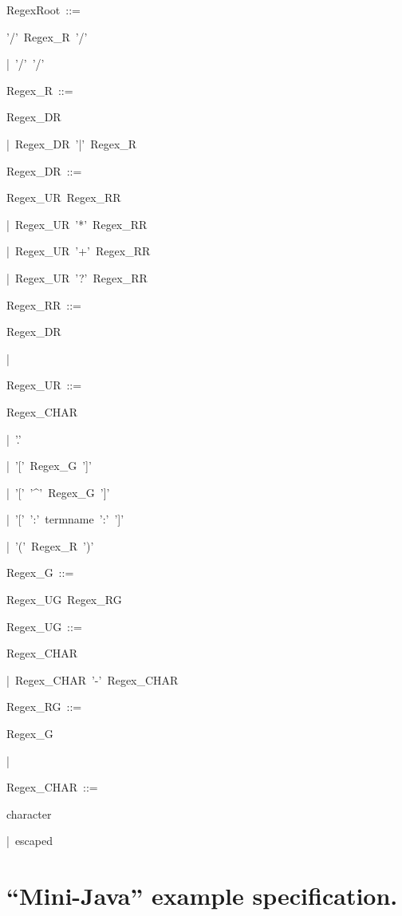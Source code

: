 \documentclass[12pt,english,twoside]{report}
\newenvironment{codeblock}
{\begin{list}{}{
\setlength{\rightmargin}{\leftmargin}
\setlength{\listparindent}{0pt}%
\raggedright
\setlength{\itemsep}{0pt}
\setlength{\parsep}{0pt}
\normalfont\ttfamily}%
 \item[]}
{\end{list}}
\begin{document}
\begin{codeblock}
RegexRoot~::=
\begin{codeblock}
'/'~Regex\_R~'/'

|~'/'~'/'
\end{codeblock}
Regex\_R~::=
\begin{codeblock}
Regex\_DR

|~Regex\_DR~'|'~Regex\_R
\end{codeblock}
Regex\_DR~::=
\begin{codeblock}
Regex\_UR~Regex\_RR

|~Regex\_UR~'{*}'~Regex\_RR

|~Regex\_UR~'+'~Regex\_RR

|~Regex\_UR~'?'~Regex\_RR
\end{codeblock}
Regex\_RR~::=
\begin{codeblock}
Regex\_DR

|
\end{codeblock}
Regex\_UR~::=
\begin{codeblock}
Regex\_CHAR

|~'.'

|~'{[}'~Regex\_G~']'

|~'{[}'~'\textasciicircum{}'~Regex\_G~']'

|~'{[}'~':'~termname~':'~']'

|~'('~Regex\_R~')'
\end{codeblock}
Regex\_G~::=
\begin{codeblock}
Regex\_UG~Regex\_RG
\end{codeblock}
Regex\_UG~::=
\begin{codeblock}
Regex\_CHAR

|~Regex\_CHAR~'-'~Regex\_CHAR
\end{codeblock}
Regex\_RG~::=
\begin{codeblock}
Regex\_G

|~
\end{codeblock}
Regex\_CHAR~::=
\begin{codeblock}
character

|~escaped
\end{codeblock}
\end{codeblock}

\chapter{\label{cha:"Mini-Java"-example-specification.}{}``Mini-Java''
example specification.}
\end{document}
